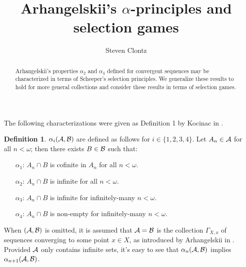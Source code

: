 \documentclass{amsart}
\theoremstyle{plain}
\theoremstyle{definition}
\newtheorem{definition}[theorem]{Definition}
\theoremstyle{remark}
\theoremstyle{plain}
\theoremstyle{definition}
\theoremstyle{remark}
\begin{document}
\title{Arhangelskii's \(\alpha\)-principles and selection games}



\author{Steven Clontz}
\address{Department of Mathematics and Statistics,
The University of South Alabama,
Mobile, AL 36688}







\begin{abstract}
Arhangelskii's properties \(\alpha_2\) and \(\alpha_4\)
defined for convergent sequences
may be characterized in terms of Scheeper's selection principles.
We generalize these results to hold for more general collections
and consider these results in terms of selection games.
\end{abstract}


\maketitle



The following characterizations were given as Definition 1 by Kocinac in
\cite{MR2417134}.

\begin{definition}
 \(\alpha_i(\mathcal{A},\mathcal{B})\) are defined as follows
for \(i\in\{1,2,3,4\}\).
Let \(A_n\in\mathcal{A}\) for all \(n<\omega\); then there exists \(B\in\mathcal{B}\) such that:
\begin{itemize}
\item[\(\alpha_1\):] \(A_n\cap B\) is cofinite in \(A_n\) for all \(n<\omega\).
\item[\(\alpha_2\):] \(A_n\cap B\) is infinite for all \(n<\omega\).
\item[\(\alpha_3\):] \(A_n\cap B\) is infinite for infinitely-many \(n<\omega\).
\item[\(\alpha_4\):] \(A_n\cap B\) is non-empty for infinitely-many \(n<\omega\).
\end{itemize}
\end{definition}

When \((\mathcal{A},\mathcal{B})\) is omitted, it is assumed that \(\mathcal{A}=\mathcal{B}\) is the
collection \(\Gamma_{X,x}\) of sequences converging to some point \(x\in X\),
as introduced by Arhangelskii in \cite{MR0394575}.
Provided \(\mathcal{A}\) only contains infinite sets, it's easy to see that
\(\alpha_n(\mathcal{A},\mathcal{B})\) implies \(\alpha_{n+1}(\mathcal{A},\mathcal{B})\).
\end{document}
